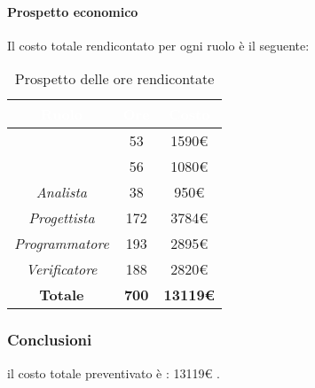 \paragraph{Prospetto economico}
Il costo totale rendicontato per ogni ruolo è il seguente:
\begin{table}[H]
	\begin{center}
		\begin{tabular}{ |c c c| }
		\rowcolor{darkblue} 
		\textcolor{white}{\textbf{Ruolo}} & \textcolor{white}{\textbf{Ore}} & \textcolor{white}{\textbf{Costo}} \\ \hline
		\textit{\Responsabile} 	& 53 	& 1590€ \\ \hline
		\textit{\Amministratore} 	& 56 	& 1080€ \\ \hline
		\textit{Analista} 		& 38 	& 950€ \\ \hline
		\textit{Progettista} 	& 172 	& 3784€ \\ \hline
		\textit{Programmatore} 	& 193 	& 2895€ \\ \hline
		\textit{Verificatore} 	& 188 	& 2820€ \\ \hline
		\textbf{Totale} & \textbf{700} & \textbf{13119€} \\ \hline
		\end{tabular}
	\caption{ Prospetto delle ore rendicontate}
	\end{center}
\end{table}
\subsubsection{Conclusioni}
il costo totale preventivato è : 13119€ .

